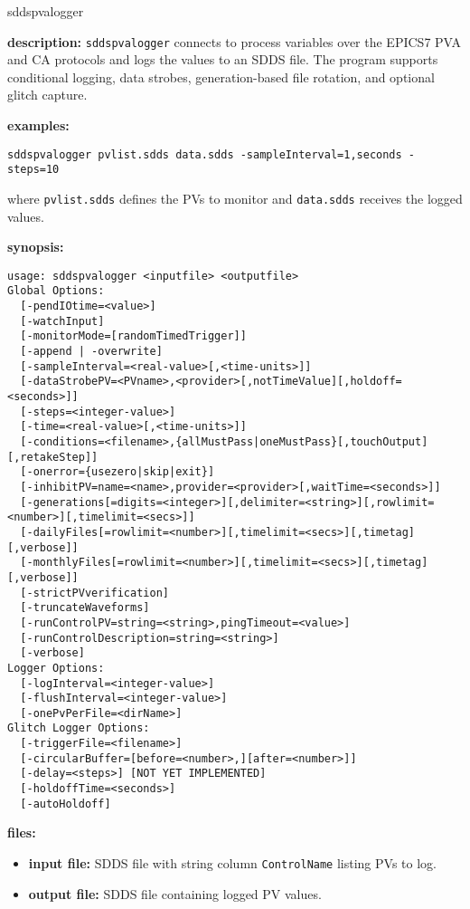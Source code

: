 \begin{sddsprog}{sddspvalogger}
\item \textbf{description:}
\verb+sddspvalogger+ connects to process variables over the EPICS7 PVA and CA protocols and logs the values to an SDDS file. The program supports conditional logging, data strobes, generation-based file rotation, and optional glitch capture.
\item \textbf{examples:}
\begin{verbatim}
sddspvalogger pvlist.sdds data.sdds -sampleInterval=1,seconds -steps=10
\end{verbatim}
where {\tt pvlist.sdds} defines the PVs to monitor and {\tt data.sdds} receives the logged values.
\item \textbf{synopsis:}
\begin{verbatim}
usage: sddspvalogger <inputfile> <outputfile>
Global Options:
  [-pendIOtime=<value>]
  [-watchInput]
  [-monitorMode=[randomTimedTrigger]]
  [-append | -overwrite]
  [-sampleInterval=<real-value>[,<time-units>]]
  [-dataStrobePV=<PVname>,<provider>[,notTimeValue][,holdoff=<seconds>]]
  [-steps=<integer-value>]
  [-time=<real-value>[,<time-units>]]
  [-conditions=<filename>,{allMustPass|oneMustPass}[,touchOutput][,retakeStep]]
  [-onerror={usezero|skip|exit}]
  [-inhibitPV=name=<name>,provider=<provider>[,waitTime=<seconds>]]
  [-generations[=digits=<integer>][,delimiter=<string>][,rowlimit=<number>][,timelimit=<secs>]]
  [-dailyFiles[=rowlimit=<number>][,timelimit=<secs>][,timetag][,verbose]]
  [-monthlyFiles[=rowlimit=<number>][,timelimit=<secs>][,timetag][,verbose]]
  [-strictPVverification]
  [-truncateWaveforms]
  [-runControlPV=string=<string>,pingTimeout=<value>]
  [-runControlDescription=string=<string>]
  [-verbose]
Logger Options:
  [-logInterval=<integer-value>]
  [-flushInterval=<integer-value>]
  [-onePvPerFile=<dirName>]
Glitch Logger Options:
  [-triggerFile=<filename>]
  [-circularBuffer=[before=<number>,][after=<number>]]
  [-delay=<steps>] [NOT YET IMPLEMENTED]
  [-holdoffTime=<seconds>]
  [-autoHoldoff]
\end{verbatim}
\item \textbf{files:}
\begin{itemize}
  \item \textbf{input file:} SDDS file with string column \verb|ControlName| listing PVs to log.
  \item \textbf{output file:} SDDS file containing logged PV values.
\end{itemize}


\end{sddsprog}

